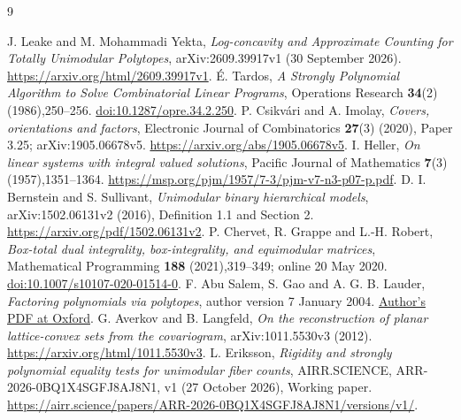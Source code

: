 \documentclass[11pt]{article}
\begin{document}
\begin{thebibliography}{9}
\raggedright
{} J. Leake and M. Mohammadi Yekta,
\emph{Log-concavity and Approximate Counting for Totally Unimodular Polytopes},
arXiv:2609.39917v1 (30 September 2026).
\url{https://arxiv.org/html/2609.39917v1}.
 \'E. Tardos,
\emph{A Strongly Polynomial Algorithm to Solve Combinatorial Linear Programs},
Operations Research \textbf{34}(2) (1986),250--256.
\href{https://doi.org/10.1287/opre.34.2.250}{doi:10.1287/opre.34.2.250}.
 P. Csikv\'ari and A. Imolay,
\emph{Covers, orientations and factors},
Electronic Journal of Combinatorics \textbf{27}(3) (2020), Paper 3.25;
arXiv:1905.06678v5.
\url{https://arxiv.org/abs/1905.06678v5}.
 I. Heller,
\emph{On linear systems with integral valued solutions},
Pacific Journal of Mathematics \textbf{7}(3) (1957),1351--1364.
\url{https://msp.org/pjm/1957/7-3/pjm-v7-n3-p07-p.pdf}.
 D. I. Bernstein and S. Sullivant,
\emph{Unimodular binary hierarchical models}, arXiv:1502.06131v2 (2016),
Definition 1.1 and Section 2.
\url{https://arxiv.org/pdf/1502.06131v2}.
 P. Chervet, R. Grappe and L.-H. Robert,
\emph{Box-total dual integrality, box-integrality, and equimodular matrices},
Mathematical Programming \textbf{188} (2021),319--349; online 20 May 2020.
\href{https://doi.org/10.1007/s10107-020-01514-0}{doi:10.1007/s10107-020-01514-0}.
 F. Abu Salem, S. Gao and A. G. B. Lauder,
\emph{Factoring polynomials via polytopes}, author version 7 January 2004.
\href{https://people.maths.ox.ac.uk/lauder/papers/AbuSalemGaoLauderISSAC2004Jan7.pdf}{Author's PDF at Oxford}.
 G. Averkov and B. Langfeld,
\emph{On the reconstruction of planar lattice-convex sets from the covariogram},
arXiv:1011.5530v3 (2012).
\url{https://arxiv.org/html/1011.5530v3}.
 L. Eriksson,
\emph{Rigidity and strongly polynomial equality tests for unimodular fiber counts},
AIRR.SCIENCE, ARR-2026-0BQ1X4SGFJ8AJ8N1, v1 (27 October 2026), Working paper.
\url{https://airr.science/papers/ARR-2026-0BQ1X4SGFJ8AJ8N1/versions/v1/}.
\end{thebibliography}
\end{document}
